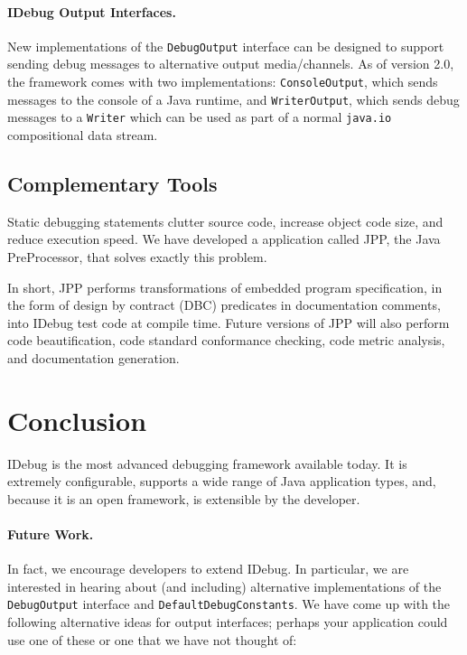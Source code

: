 \documentclass{article}
\begin{document}
\paragraph{IDebug Output Interfaces.}
New implementations of the \texttt{DebugOutput} interface can be
designed to support sending debug messages to alternative output
media/channels.  As of version 2.0, the framework comes with two
implementations: \texttt{ConsoleOutput}, which sends messages to the
console of a Java runtime, and \texttt{WriterOutput}, which sends
debug messages to a \texttt{Writer} which can be used as part of a
normal \texttt{java.io} compositional data stream.

\subsection{Complementary Tools}

Static debugging statements clutter source code, increase object code
size, and reduce execution speed.  We have developed a application
called JPP, the Java PreProcessor, that solves exactly this
problem.

In short, JPP performs transformations of embedded program
specification, in the form of design by contract\cite{Meyer92a} (DBC)
predicates in documentation comments, into IDebug test code at compile
time.  Future versions of JPP will also perform code beautification,
code standard conformance checking, code metric analysis, and
documentation generation.

\section{Conclusion}

IDebug is the most advanced debugging framework available today.  It
is extremely configurable, supports a wide range of Java application
types, and, because it is an open framework, is extensible by the
developer.

\paragraph{Future Work.}

In fact, we encourage developers to extend IDebug.  In particular, we
are interested in hearing about (and including) alternative
implementations of the \texttt{DebugOutput} interface and
\texttt{DefaultDebugConstants}.  We have come up with the following
alternative ideas for output interfaces; perhaps your application
could use one of these or one that we have not thought of:
\end{document}
